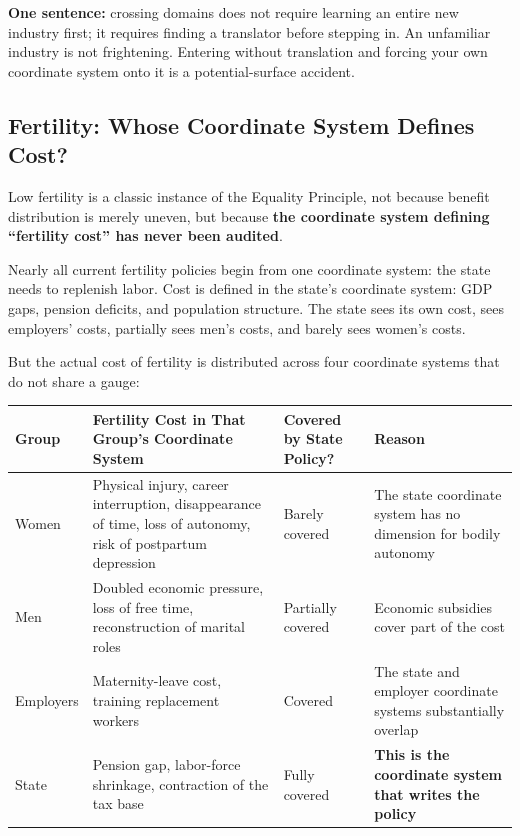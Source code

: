 \documentclass[12pt,a4paper]{article}
\theoremstyle{remark}
\begin{document}
\textbf{One sentence:} crossing domains does not require learning an entire new industry first; it requires finding a translator before stepping in. An unfamiliar industry is not frightening. Entering without translation and forcing your own coordinate system onto it is a potential-surface accident.

\subsection{Fertility: Whose Coordinate System Defines Cost?}

Low fertility is a classic instance of the Equality Principle, not because benefit distribution is merely uneven, but because \textbf{the coordinate system defining ``fertility cost'' has never been audited}.

Nearly all current fertility policies begin from one coordinate system: the state needs to replenish labor. Cost is defined in the state's coordinate system: GDP gaps, pension deficits, and population structure. The state sees its own cost, sees employers' costs, partially sees men's costs, and barely sees women's costs.

But the actual cost of fertility is distributed across four coordinate systems that do not share a gauge:

\begin{center}
\begin{tabular}{p{2cm} p{5cm} p{5cm} p{3cm}}
\toprule
\textbf{Group} & \textbf{Fertility Cost in That Group's Coordinate System} & \textbf{Covered by State Policy?} & \textbf{Reason} \\
\midrule
Women & Physical injury, career interruption, disappearance of time, loss of autonomy, risk of postpartum depression & Barely covered & The state coordinate system has no dimension for bodily autonomy \\
\hline
Men & Doubled economic pressure, loss of free time, reconstruction of marital roles & Partially covered & Economic subsidies cover part of the cost \\
\hline
Employers & Maternity-leave cost, training replacement workers & Covered & The state and employer coordinate systems substantially overlap \\
\hline
State & Pension gap, labor-force shrinkage, contraction of the tax base & Fully covered & \textbf{This is the coordinate system that writes the policy} \\
\bottomrule
\end{tabular}
\end{center}
\end{document}
